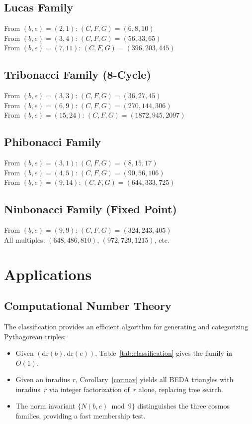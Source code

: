 \documentclass[12pt]{article}
\begin{document}
\subsection{Lucas Family}
From $(b, e) = (2, 1)$: $(C, F, G) = (6, 8, 10)$\\
From $(b, e) = (3, 4)$: $(C, F, G) = (56, 33, 65)$\\
From $(b, e) = (7, 11)$: $(C, F, G) = (396, 203, 445)$

\subsection{Tribonacci Family (8-Cycle)}
From $(b, e) = (3, 3)$: $(C, F, G) = (36, 27, 45)$\\
From $(b, e) = (6, 9)$: $(C, F, G) = (270, 144, 306)$\\
From $(b, e) = (15, 24)$: $(C, F, G) = (1872, 945, 2097)$

\subsection{Phibonacci Family}
From $(b, e) = (3, 1)$: $(C, F, G) = (8, 15, 17)$\\
From $(b, e) = (4, 5)$: $(C, F, G) = (90, 56, 106)$\\
From $(b, e) = (9, 14)$: $(C, F, G) = (644, 333, 725)$

\subsection{Ninbonacci Family (Fixed Point)}
From $(b, e) = (9, 9)$: $(C, F, G) = (324, 243, 405)$\\
All multiples: $(648, 486, 810)$, $(972, 729, 1215)$, etc.

\section{Applications}

\subsection{Computational Number Theory}

The classification provides an efficient algorithm for generating and categorizing Pythagorean triples:
\begin{itemize}
\item Given $(\mathrm{dr}(b),\mathrm{dr}(e))$, Table~\ref{tab:classification} gives the family in $O(1)$.
\item Given an inradius $r$, Corollary~\ref{cor:nav} yields all BEDA triangles with inradius~$r$ via integer factorization of~$r$ alone, replacing tree search.
\item The norm invariant $\{N(b,e)\bmod9\}$ distinguishes the three cosmos families, providing a fast membership test.
\end{itemize}
\end{document}
